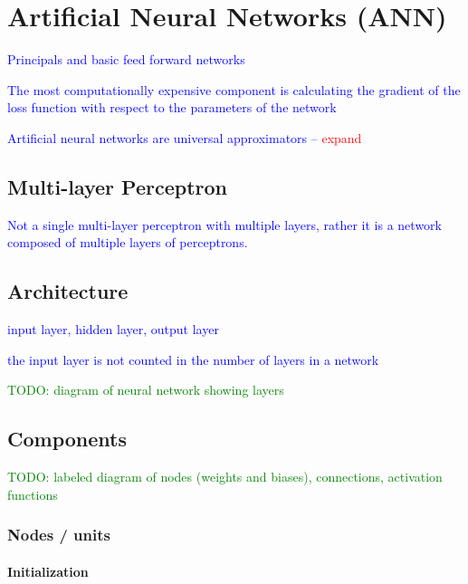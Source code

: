\section{Artificial Neural Networks (ANN)}

\textcolor{blue}{Principals and basic feed forward networks}

\textcolor{blue}{The most computationally expensive component is calculating the gradient of the loss function with respect to the parameters of the network}

\textcolor{blue}{Artificial neural networks are {universal approximators} -- \textcolor{red}{expand}}

\subsection{Multi-layer Perceptron}

\textcolor{blue}{Not a single multi-layer perceptron with multiple layers, rather it is a network composed of multiple layers of perceptrons.}

\subsection{Architecture}

\textcolor{blue}{{input layer}, {hidden layer}, {output layer}}

\textcolor{blue}{the input layer is not counted in the number of layers in a network}

\textcolor{green}{TODO: diagram of neural network showing layers}

\subsection{Components}

\textcolor{green}{TODO: labeled diagram of nodes (weights and biases), connections, activation functions}

\subsubsection{Nodes / units}

\paragraph{Initialization}

